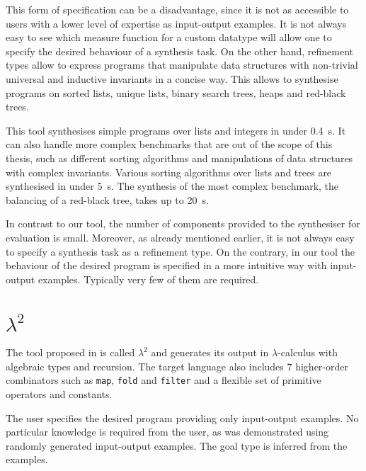 This form of specification can be a disadvantage, since it is not as accessible to users with a lower level of expertise as input-output examples. It is not always easy to see which measure function for a custom datatype will allow one to specify the desired behaviour of a synthesis task.
On the other hand, refinement types allow to express programs that manipulate data structures with non-trivial universal and inductive invariants in a concise way. This allows to synthesise programs on sorted lists, unique lists, binary search trees, heaps and red-black trees.

This tool synthesises simple programs over lists and integers in under \SI{0.4}{s}. It can also handle more complex benchmarks that are out of the scope of this thesis, such as different sorting algorithms and manipulations of data structures with complex invariants. Various sorting algorithms over lists and trees are synthesised in under \SI{5}{s}. The synthesis of the most complex benchmark, the balancing of a red-black tree, takes up to \SI{20}{s}.

In contrast to our tool, the number of components provided to the synthesiser for evaluation is small. Moreover, as already mentioned earlier, it is not always easy to specify a synthesis task as a refinement type. On the contrary, in our tool the behaviour of the desired program is specified in a more intuitive way with input-output examples. Typically very few of them are required.

\section{$\lambda^2$}

The tool proposed in \cite{LambdaSquarePaper} is called $\lambda^2$ and generates its output in $\lambda$-calculus with algebraic types and recursion. The target language also includes $7$ higher-order combinators such as \lstinline!map!, \lstinline!fold! and \lstinline!filter! and a flexible set of primitive operators and constants.

The user specifies the desired program providing only input-output examples. No particular knowledge is required from the user, as was demonstrated using randomly generated input-output examples. The goal type is inferred from the examples.

